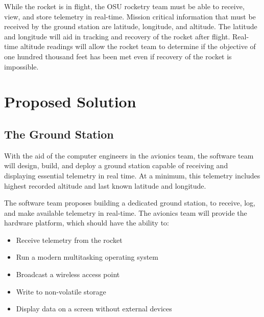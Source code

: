 \documentclass[10pt,journal,draftclsnofoot,onecolumn]{IEEEtran}
\begin{document}
	While the rocket is in flight, the \ac{OSU} rocketry team
	must be able to receive, view, and store telemetry in real-time.
	Mission critical information that must be received by the ground
	station are latitude, longitude, and altitude. The latitude
	and longitude will aid in tracking and recovery of the rocket
	after flight. Real-time altitude readings will allow the rocket
	team to determine if the objective of one hundred thousand feet
	has been met even if recovery of the rocket is impossible.
	
	
	\section{Proposed Solution}

	\subsection{The Ground Station}

	With the aid of the computer engineers in the avionics team,
	the software team will design, build, and deploy a ground station
	capable of receiving and displaying essential telemetry in real time.
	At a minimum, this telemetry includes highest recorded altitude and
	last known latitude and longitude.

	The software team proposes building a dedicated ground station,
	to receive, log, and make available telemetry in real-time.
	The avionics team will provide the hardware platform, which should
	have the ability to:

	\begin{itemize}
	\item Receive telemetry from the rocket
	\item Run a modern multitasking operating system
	\item Broadcast a wireless access point
	\item Write to non-volatile storage
	\item Display data on a screen without external devices
	\end{itemize}
\end{document}
